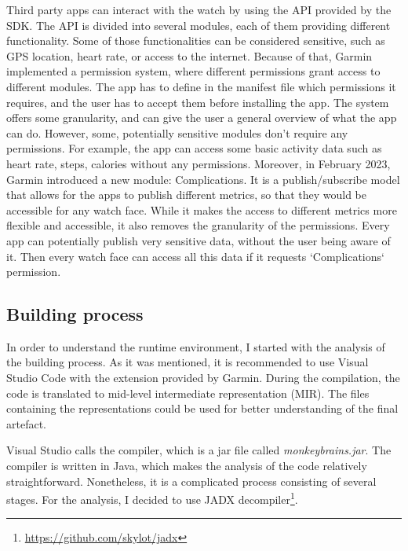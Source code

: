 Third party apps can interact with the watch by using the API provided by the SDK.
The API is divided into several modules, each of them providing different functionality.
Some of those functionalities can be considered sensitive, such as GPS location, heart rate, or access to the internet.
Because of that, Garmin implemented a permission system, where different permissions grant access to different modules.
The app has to define in the manifest file which permissions it requires, and the user has to accept them before installing the app.
The system offers some granularity, and can give the user a general overview of what the app can do.
However, some, potentially sensitive modules don't require any permissions.
For example, the app can access some basic activity data such as heart rate, steps, calories without any permissions.
Moreover, in February 2023, Garmin introduced a new module: Complications.
It is a publish/subscribe model that allows for the apps to publish different metrics, so that they would be accessible for any watch face.
While it makes the access to different metrics more flexible and accessible, it also removes the granularity of the permissions.
Every app can potentially publish very sensitive data, without the user being aware of it.
Then every watch face can access all this data if it requests `Complications` permission.

\subsection{Building process}
In order to understand the runtime environment, I started with the analysis of the building process.
As it was mentioned, it is recommended to use Visual Studio Code with the extension provided by Garmin.
During the compilation, the code is translated to mid-level intermediate representation (MIR).
The files containing the representations could be used for better understanding of the final artefact.

Visual Studio calls the compiler, which is a jar file called \textit{monkeybrains.jar}.
The compiler is written in Java, which makes the analysis of the code relatively straightforward.
Nonetheless, it is a complicated process consisting of several stages.
For the analysis, I decided to use JADX decompiler\footnote{\url{https://github.com/skylot/jadx}}.

